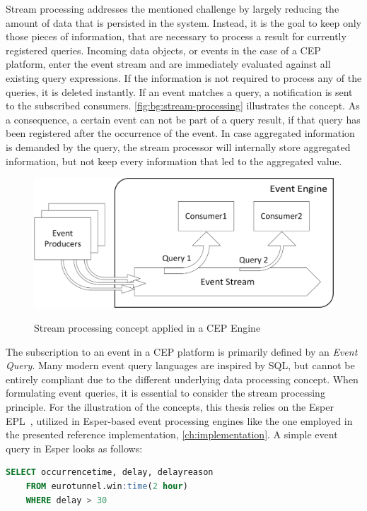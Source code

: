 Stream processing addresses the mentioned challenge by largely reducing the amount of data that is persisted in the system. Instead, it is the goal to keep only those pieces of information, that are necessary to process a result for currently registered queries.
Incoming data objects, or events in the case of a CEP platform, enter the event stream and are immediately evaluated against all existing query expressions. If the information is not required to process any of the queries, it is deleted instantly. If an event matches a query, a notification is sent to the subscribed consumers. \autoref{fig:bg:stream-processing} illustrates the concept.
As a consequence, a certain event can not be part of a query result, if that query has been registered after the occurrence of the event.
In case aggregated information is demanded by the query, the stream processor will internally store aggregated information, but not keep every information that led to the aggregated value.~\cite{streamprocessing} 

\begin{figure}[]
	\myfloatalign
	{\includegraphics[width=0.7\linewidth]{chapters/background/cep-stream-processing.png}}
	\caption{Stream processing concept applied in a CEP Engine}
	\label{fig:bg:stream-processing}
\end{figure}

The subscription to an event in a CEP platform is primarily defined by an \textit{Event Query}.
Many modern event query languages are inspired by \acs{SQL}, but cannot be entirely compliant due to the different underlying data processing concept.
When formulating event queries, it is essential to consider the stream processing principle.
For the illustration of the concepts, this thesis relies on the Esper \ac{EPL}~\cite{esperhome}, utilized in Esper-based event processing engines like the one employed in the presented reference implementation, \autoref{ch:implementation}.
A simple event query in Esper looks as follows:

\begin{lstlisting}[language=sql,caption={Sample Query in Esper EPL},label=lst:epl-query-example]
	SELECT occurrencetime, delay, delayreason 
	FROM eurotunnel.win:time(2 hour)
	WHERE delay > 30
\end{lstlisting}

